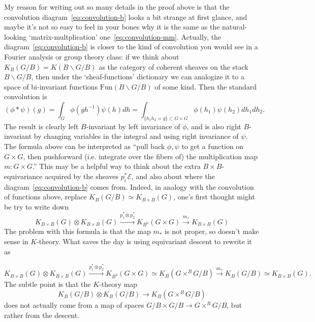 \documentclass[11pt]{amsart}
\theoremstyle{definition}
\newcommand{\Ec}{\mathcal{E}}
\newcommand{\Fun}{\mathrm{Fun}}
\numberwithin{equation}{subsection}
\numberwithin{figure}{subsection}
\begin{document}
My reason for writing out so many details in the proof above is that the convolution diagram~\eqref{eq:convolution-b} looks a bit strange at first glance, and maybe it's not so easy to feel in your bones why it is the same as the natural-looking `matrix-multplication' one~\eqref{eq:convolution-mm}. Actually, the diagram~\eqref{eq:convolution-b} is closer to the kind of convolution you would see in a Fourier analysis or group theory class: if we think about $K_B(G/B) = K(B\backslash G/B)$ as the category of coherent sheaves on the stack $B\backslash G/B$, then under the `sheaf-functions' dictionary we can analogize it to a space of bi-invariant functions $\Fun(B\backslash G/B)$ of some kind. Then the standard convolution is 
$$
(\phi*\psi)(g)=\int_G \phi(gh^{-1})\psi(h)dh = \int_{\{h_1h_2=g\}\subset G\times G} \phi(h_1)\psi(h_2)dh_1dh_2.
$$
The result is clearly left $B$-invariant by left invariance of $\phi$, and is also right $B$-invariant by changing variables in the integral and using right invariance of $\psi$. The formula above can be interpreted as ``pull back $\phi,\psi$ to get a function on $G\times G$, then pushforward (i.e. integrate over the fibers of) the multiplication map $m:G\times G$.''
This may be a helpful way to think about the extra $B\times B$-equivariance acquired  by the sheaves $p_i^*\Ec$, and also about where the diagram~\eqref{eq:convolution-b} comes from. Indeed, in analogy with the convolution of functions above, replace $K_B(G/B)\simeq K_{B\times B}(G)$, one's first thought might be try to write down
$$
K_{B\times B}(G)\otimes K_{B\times B}(G) \xrightarrow{p_1^*\otimes p_2^*} K_{B^3}(G\times G)\xrightarrow{m_*} K_{B\times B}(G)
$$
The problem with this formula is that the map $m_*$ is not proper, so doesn't make sense in $K$-theory. What saves the day is using equivariant descent to rewrite it as

$$
K_{B\times B}(G)\otimes K_{B\times B}(G) \xrightarrow{p_1^*\otimes p_2^*}K_{B^3}(G\times G) \simeq K_{B}(G\times^B G/B)\xrightarrow{m_*} K_{B}(G/B)\simeq K_{B\times B}(G).
$$
The subtle point is that the $K$-theory map
$$
K_{B}(G/B)\otimes K_{B}(G/B)\rightarrow K_{B}(G\times^B G/B)
$$
does not actually come from a map  of spaces $G/B\times G/B\rightarrow G\times^B G/B$, but rather from the descent. %
\end{document}
